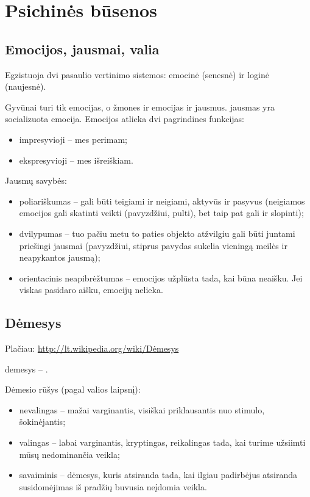 \chapter{Psichinės būsenos}

\label{psichines_busenos}

\section{Emocijos, jausmai, valia}

Egzistuoja dvi pasaulio vertinimo sistemos: emocinė (senesnė) ir loginė 
(naujesnė). 

Gyvūnai turi tik emocijas, o žmones ir emocijas ir jausmus. \Gls{jausmas} 
yra socializuota \gls{emocija}. Emocijos atlieka dvi pagrindines funkcijas:

\begin{itemize}
  \item impresyvioji – mes perimam;
  \item ekspresyvioji – mes išreiškiam.
\end{itemize}

Jausmų savybės:

\begin{itemize}
  \item poliariškumas – gali būti teigiami ir neigiami, aktyvūs ir pasyvus
    (neigiamos emocijos gali skatinti veikti (pavyzdžiui, pulti), bet taip 
    pat gali ir slopinti);
  \item dvilypumas – tuo pačiu metu to paties objekto atžvilgiu gali būti
    juntami priešingi jausmai (pavyzdžiui, stiprus pavydas sukelia 
    vieningą meilės ir neapykantos jausmą);
  \item orientacinis neapibrėžtumas – emocijos užplūsta tada, kai būna
    neaišku. Jei viskas pasidaro aišku, emocijų nelieka.
\end{itemize}

\section{Dėmesys}

Plačiau: \url{http://lt.wikipedia.org/wiki/Dėmesys}

\Gls{demesys} – .

Dėmesio rūšys (pagal valios laipsnį):

\begin{itemize}
  \item nevalingas – mažai varginantis, visiškai priklausantis nuo stimulo, 
    šokinėjantis;
  \item valingas – labai varginantis, kryptingas, reikalingas tada, kai 
    turime užsiimti mūsų nedominančia veikla;
  \item savaiminis – dėmesys, kuris atsiranda tada, kai ilgiau padirbėjus
    atsiranda susidomėjimas iš pradžių buvusia neįdomia veikla.
\end{itemize}


